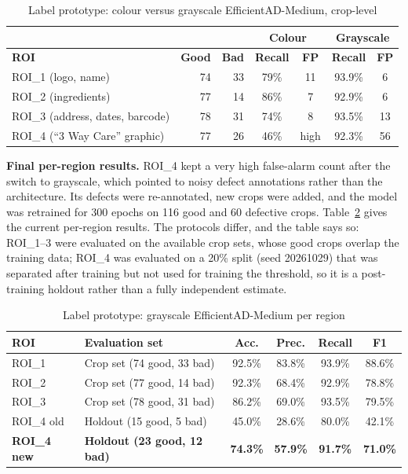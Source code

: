 \begin{table}[htbp]
\centering
\caption{Label prototype: colour versus grayscale EfficientAD-Medium, crop-level}
\label{tab:label-colour}
\begin{tabular}{|l|r|r|c|c|c|c|}
\hline
 & & & \multicolumn{2}{c|}{\textbf{Colour}} & \multicolumn{2}{c|}{\textbf{Grayscale}} \\ \hline
\textbf{ROI} & \textbf{Good} & \textbf{Bad} & \textbf{Recall} & \textbf{FP} & \textbf{Recall} & \textbf{FP} \\ \hline
ROI\_1 (logo, name) & 74 & 33 & 79\% & 11 & 93.9\% & 6 \\ \hline
ROI\_2 (ingredients) & 77 & 14 & 86\% & 7 & 92.9\% & 6 \\ \hline
ROI\_3 (address, dates, barcode) & 78 & 31 & 74\% & 8 & 93.5\% & 13 \\ \hline
ROI\_4 (``3 Way Care'' graphic) & 77 & 26 & 46\% & high & 92.3\% & 56 \\ \hline
\end{tabular}
\end{table}

\noindent\textbf{Final per-region results.} ROI\_4 kept a very high false-alarm count after the switch to grayscale, which pointed to noisy defect annotations rather than the architecture. Its defects were re-annotated, new crops were added, and the model was retrained for 300 epochs on 116 good and 60 defective crops. Table~\ref{tab:label-roi} gives the current per-region results. The protocols differ, and the table says so: ROI\_1--3 were evaluated on the available crop sets, whose good crops overlap the training data; ROI\_4 was evaluated on a 20\% split (seed 20261029) that was separated after training but not used for training the threshold, so it is a post-training holdout rather than a fully independent estimate.

\begin{table}[htbp]
\centering
\caption{Label prototype: grayscale EfficientAD-Medium per region}
\label{tab:label-roi}
\begin{tabular}{|l|l|c|c|c|c|}
\hline
\textbf{ROI} & \textbf{Evaluation set} & \textbf{Acc.} & \textbf{Prec.} & \textbf{Recall} & \textbf{F1} \\ \hline
ROI\_1 & Crop set (74 good, 33 bad) & 92.5\% & 83.8\% & 93.9\% & 88.6\% \\ \hline
ROI\_2 & Crop set (77 good, 14 bad) & 92.3\% & 68.4\% & 92.9\% & 78.8\% \\ \hline
ROI\_3 & Crop set (78 good, 31 bad) & 86.2\% & 69.0\% & 93.5\% & 79.5\% \\ \hline
ROI\_4 old & Holdout (15 good, 5 bad) & 45.0\% & 28.6\% & 80.0\% & 42.1\% \\ \hline
\textbf{ROI\_4 new} & \textbf{Holdout (23 good, 12 bad)} & \textbf{74.3\%} & \textbf{57.9\%} & \textbf{91.7\%} & \textbf{71.0\%} \\ \hline
\end{tabular}
\end{table}

